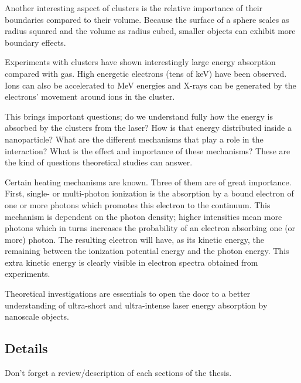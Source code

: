 Another interesting aspect of clusters is the relative importance of 
their boundaries compared to their volume. Because the surface of a sphere 
scales as radius squared and the volume as radius cubed, smaller objects can 
exhibit more boundary effects.

Experiments with clusters have shown interestingly large energy absorption 
compared with gas. High energetic electrons (tens of keV) have been observed. 
Ions can also be accelerated to MeV energies and X-rays can be generated by the 
electrons' movement around ions in the cluster.

This brings important questions; do we understand fully how the energy is 
absorbed by the clusters from the laser? How is that energy distributed 
inside a nanoparticle? What are the different mechanisms that play a role in 
the interaction? What is the effect and importance of these mechanisms? These 
are the kind of questions theoretical studies can answer.

Certain heating mechanisms are known. Three of them are of great importance. 
First, single- or multi-photon ionization is the absorption by a bound electron 
of one or more photons which promotes this electron to the continuum. This 
mechanism is dependent on the photon density; higher intensities mean more 
photons which in turns increases the probability of an electron absorbing one 
(or more) photon. The resulting electron will have, as its kinetic energy, the 
remaining between the ionization potential energy and the photon energy. This 
extra kinetic energy is clearly visible in electron spectra obtained from 
experiments.



Theoretical investigations are essentials to open the door to a better 
understanding of ultra-short and ultra-intense laser energy absorption by 
nanoscale objects.





\subsection{Details}

Don't forget a review/description of each sections of the thesis.

